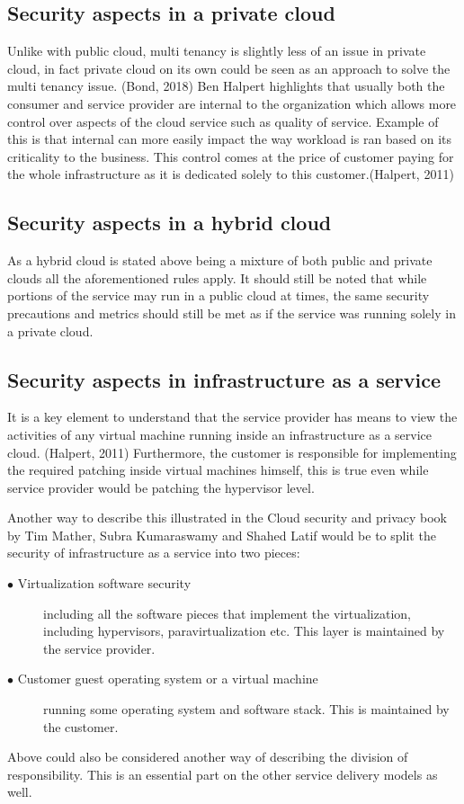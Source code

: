 \documentclass{article}
\begin{document}
\subsection{Security aspects in a private cloud}
Unlike with public cloud, multi tenancy is slightly less of an issue in private cloud, in fact private cloud on its own could be seen as an approach to solve the multi tenancy issue. (Bond, 2018)
Ben Halpert highlights that usually both the consumer and service provider are internal to the organization which allows more control over aspects of the cloud service such as quality of service.
Example of this is that internal can more easily impact the way workload is ran based on its criticality to the business. This control comes at the price of customer paying for the whole infrastructure as it is dedicated solely to this customer.(Halpert, 2011) 
\subsection{Security aspects in a hybrid cloud}
As a hybrid cloud is stated above being a mixture of both public and private clouds all the aforementioned rules apply. It should still be noted that while portions of the service may run in a public cloud at times, the same security precautions and metrics should still be met as if the service was running solely in a private cloud.
\subsection{Security aspects in infrastructure as a service}
It is a key element to understand that the service provider has means to view the activities of any virtual machine running inside an infrastructure as a service cloud. (Halpert, 2011)
Furthermore, the customer is responsible for implementing the required patching inside virtual machines himself, this is true even while service provider would be patching the hypervisor level.
\par
Another way to describe this illustrated in the Cloud security and privacy book by Tim Mather, Subra Kumaraswamy and Shahed Latif would be to split the security of infrastructure as a service into two pieces:
\begin{description}
	\item[$\bullet$ Virtualization software security] including all the software pieces that implement the virtualization, including hypervisors, paravirtualization etc. This layer is maintained by the service provider.
	\item[$\bullet$ Customer guest operating system or a virtual machine] running some operating system and software stack. This is maintained by the customer.
\end{description}
Above could also be considered another way of describing the division of responsibility. This is an essential part on the other service delivery models as well.
\end{document}
